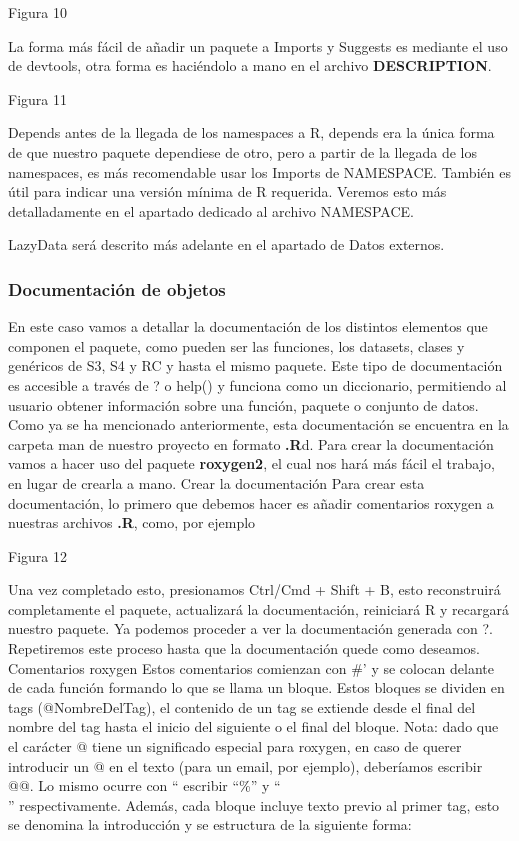 Figura 10

La forma m\'as f\'acil de a\~nadir un paquete a Imports y Suggests es mediante el uso de
devtools, otra forma es haci\'endolo a mano en el archivo \textbf{DESCRIPTION}.

Figura 11

Depends antes de la llegada de los namespaces a R, depends era la \'unica forma de que
nuestro paquete dependiese de otro, pero a partir de la llegada de los namespaces, es m\'as
recomendable usar los Imports de NAMESPACE. Tambi\'en es \'util para indicar una versi\'on
m\'inima de R requerida. Veremos esto m\'as detalladamente en el apartado dedicado al archivo
NAMESPACE.

LazyData ser\'a descrito m\'as adelante en el apartado de Datos externos.

\subsubsection{Documentaci\'on de objetos}

En este caso vamos a detallar la documentaci\'on de los distintos elementos que componen el
paquete, como pueden ser las funciones, los datasets, clases y gen\'ericos de S3, S4 y RC y
hasta el mismo paquete.
Este tipo de documentaci\'on es accesible a trav\'es de ? o help() y funciona como un
diccionario, permitiendo al usuario obtener informaci\'on sobre una funci\'on, paquete o conjunto
de datos.
Como ya se ha mencionado anteriormente, esta documentaci\'on se encuentra en la carpeta
man de nuestro proyecto en formato \textbf{.R}d. Para crear la documentaci\'on vamos a hacer uso del
paquete \textbf{roxygen2}, el cual nos har\'a m\'as f\'acil el trabajo, en lugar de crearla a mano.
Crear la documentaci\'on
Para crear esta documentaci\'on, lo primero que debemos hacer es a\~nadir comentarios
roxygen a nuestras archivos \textbf{.R}, como, por ejemplo

Figura 12

Una vez completado esto, presionamos Ctrl/Cmd + Shift + B, esto reconstruir\'a
completamente el paquete, actualizar\'a la documentaci\'on, reiniciar\'a R y recargar\'a nuestro
paquete. Ya podemos proceder a ver la documentaci\'on generada con ?. Repetiremos este
proceso hasta que la documentaci\'on quede como deseamos.
Comentarios roxygen
Estos comentarios comienzan con \#' y se colocan delante de cada funci\'on formando lo que
se llama un bloque. Estos bloques se dividen en tags (@NombreDelTag), el contenido de un
tag se extiende desde el final del nombre del tag hasta el inicio del siguiente o el final del
bloque.
Nota: dado que el car\'acter @ tiene un significado especial para roxygen, en caso de querer
introducir un @ en el texto (para un email, por ejemplo), deber\'iamos escribir @@. Lo mismo
ocurre con “%
escribir “\%” y “\\” respectivamente.
Adem\'as, cada bloque incluye texto previo al primer tag, esto se denomina la introducci\'on y
se estructura de la siguiente forma:

